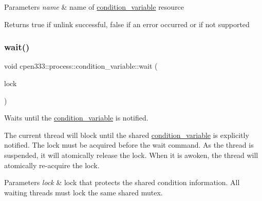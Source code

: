 \begin{DoxyParams}{Parameters}
{\em name} & name of \hyperlink{classcpen333_1_1process_1_1condition__variable}{condition\+\_\+variable} resource \\
\hline
\end{DoxyParams}
\begin{DoxyReturn}{Returns}
{\ttfamily true} if unlink successful, {\ttfamily false} if an error occurred or if not supported 
\end{DoxyReturn}
\mbox{\label{classcpen333_1_1process_1_1condition__variable_ae5b7ef264d9618986be69d5c0c488925}} 
\subsubsection{\texorpdfstring{wait()}{wait()}\hspace{0.1cm}{\footnotesize\ttfamily [1/2]}}
{\footnotesize\ttfamily void cpen333\+::process\+::condition\+\_\+variable\+::wait (\begin{DoxyParamCaption}\item[{std\+::unique\+\_\+lock$<$ \hyperlink{classcpen333_1_1process_1_1mutex}{cpen333\+::process\+::mutex} $>$ \&}]{lock }\end{DoxyParamCaption})\hspace{0.3cm}{\ttfamily [inline]}}



Waits until the \hyperlink{classcpen333_1_1process_1_1condition__variable}{condition\+\_\+variable} is notified. 

The current thread will block until the shared \hyperlink{classcpen333_1_1process_1_1condition__variable}{condition\+\_\+variable} is explicitly notified. The lock must be acquired before the wait command. As the thread is suspended, it will atomically release the lock. When it is awoken, the thread will atomically re-\/acquire the lock.


\begin{DoxyParams}{Parameters}
{\em lock} & lock that protects the shared condition information. All waiting threads must lock the same shared mutex. \\
\hline
\end{DoxyParams}
\mbox{\label{classcpen333_1_1process_1_1condition__variable_a17c52558451f262f411da1944319eb46}} 
